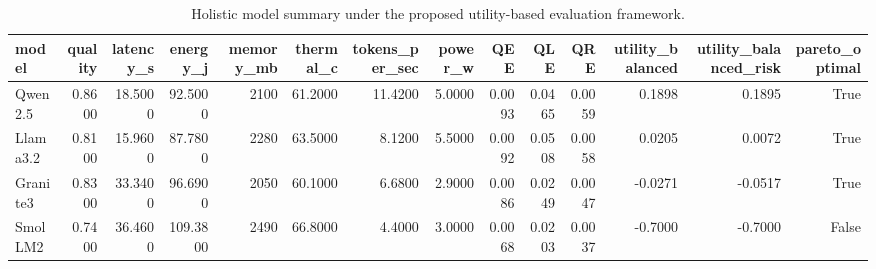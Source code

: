 \begin{table}
\caption{Holistic model summary under the proposed utility-based evaluation framework.}
\label{tab:holistic_model_summary}
\begin{tabular}{lrrrrrrrrrrrrr}
\toprule
model & quality & latency_s & energy_j & memory_mb & thermal_c & tokens_per_sec & power_w & QEE & QLE & QRE & utility_balanced & utility_balanced_risk & pareto_optimal \\
\midrule
Qwen2.5 & 0.8600 & 18.5000 & 92.5000 & 2100 & 61.2000 & 11.4200 & 5.0000 & 0.0093 & 0.0465 & 0.0059 & 0.1898 & 0.1895 & True \\
Llama3.2 & 0.8100 & 15.9600 & 87.7800 & 2280 & 63.5000 & 8.1200 & 5.5000 & 0.0092 & 0.0508 & 0.0058 & 0.0205 & 0.0072 & True \\
Granite3 & 0.8300 & 33.3400 & 96.6900 & 2050 & 60.1000 & 6.6800 & 2.9000 & 0.0086 & 0.0249 & 0.0047 & -0.0271 & -0.0517 & True \\
SmolLM2 & 0.7400 & 36.4600 & 109.3800 & 2490 & 66.8000 & 4.4000 & 3.0000 & 0.0068 & 0.0203 & 0.0037 & -0.7000 & -0.7000 & False \\
\bottomrule
\end{tabular}
\end{table}

